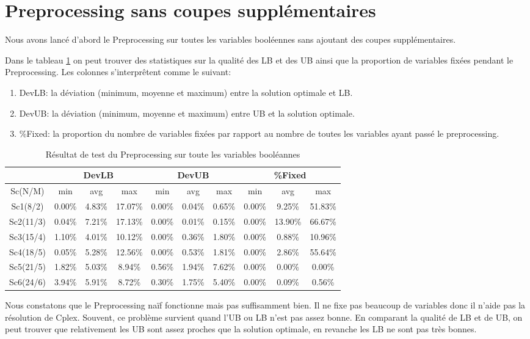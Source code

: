 \documentclass[twoside,fleqn]{EPURapport}
\begin{document}
\section{Preprocessing sans coupes supplémentaires}
Nous avons lancé d'abord le Preprocessing sur toutes les variables booléennes sans ajoutant des coupes supplémentaires.

Dans le tableau \ref{tab_pre} on peut trouver des statistiques sur la qualité des LB et des UB ainsi que la proportion de variables fixées pendant le Preprocessing. Les colonnes s'interprêtent comme le suivant:
\begin{enumerate}
	\item DevLB: la déviation (minimum, moyenne et maximum) entre la solution optimale et LB.
	\item DevUB: la déviation (minimum, moyenne et maximum) entre UB et la solution optimale.
	\item \%Fixed: la proportion du nombre de variables fixées par rapport au nombre de toutes les variables ayant passé le preprocessing.
\end{enumerate}

\bigskip
\begin{table}[h]
    \centering
    \begin{tabular}{|c|c|c|c|c|c|c|c|c|c|}
    	\hline 
    	&\multicolumn{3}{c|}{DevLB}& \multicolumn{3}{c|}{DevUB}& \multicolumn{3}{c|}{\%Fixed} 	\\ \hline
    	Sc(N/M)	& min & avg & max & min & avg & max & min & avg & max\\ \hline
Sc1(8/2) & 0.00\%  &4.83\%  &17.07\%  &0.00\% & 0.04\%  &0.65\%  &0.00\%  &9.25\% &51.83\% \\ \hline
Sc2(11/3)&  0.04\% & 7.21\% & 17.13\% & 0.00\%&  0.01\% & 0.15\% & 0.00\% &13.90\% & 66.67\%\\ \hline
Sc3(15/4)&  1.10\% & 4.01\% & 10.12\% & 0.00\%&  0.36\% & 1.80\% & 0.00\% &0.88\% & 10.96\%\\ \hline
Sc4(18/5)&  0.05\% & 5.28\% & 12.56\% & 0.00\%&  0.53\% & 1.81\% & 0.00\% &2.86\% & 55.64\%\\ \hline
Sc5(21/5)&  1.82\% & 5.03\% & 8.94\%  &0.56\% & 1.94\%  &7.62\%  &0.00\%  &0.00\% &0.00\%\\ \hline
Sc6(24/6)&  3.94\% & 5.91\% & 8.72\%  &0.30\% & 1.75\%  &5.40\%  &0.00\%  &0.09\% &0.56\%\\ \hline
    \end{tabular}
    \caption{Résultat de test du Preprocessing sur toute les variables booléannes}
    \label{tab_pre}
\end{table}
\bigskip
Nous constatons que le Preprocessing naïf fonctionne mais pas suffisamment bien. Il ne fixe pas beaucoup de variables donc il n'aide pas la résolution de Cplex. Souvent, ce problème survient quand l'UB ou LB n'est pas assez bonne. En comparant la qualité de LB et de UB, on peut trouver que relativement les UB sont assez proches que la solution optimale, en revanche les LB ne sont pas très bonnes.
\end{document}
